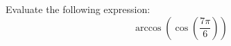 \documentclass{ximera}
\author{David Kish}
\begin{document}
\begin{exercise}
Evaluate the following expression:
\[
\arccos(\cos(\frac{7\pi}{6}))
\]
\begin{multipleChoice}
\end{multipleChoice}
\end{exercise}
\end{document}
